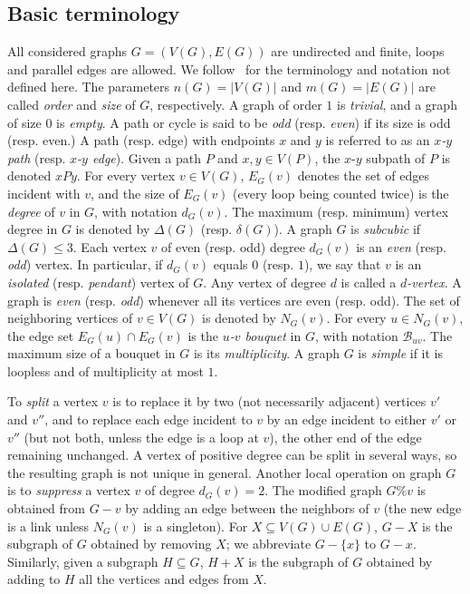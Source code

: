 \documentclass[a4paper,12pt]{article}
\numberwithin{equation}{section}
\begin{document}
\subsection{Basic terminology}

All considered graphs $G=(V(G),E(G))$ are undirected and finite, loops and parallel edges are allowed. We follow~\cite{BonMur08} for the terminology and notation not defined here. The parameters $n(G)=|V(G)|$ and $m(G)=|E(G)|$ are called \textit{order} and \textit{size} of $G$, respectively. A graph of order $1$ is \textit{trivial}, and a graph of size $0$ is \textit{empty}. A path or cycle is said to be \textit{odd} (resp. \textit{even}) if its size is odd (resp. even.) A path (resp. edge) with endpoints $x$ and $y$ is referred to as an \textit{$x$-$y$ path} (resp. \textit{$x$-$y$ edge}). Given a path $P$ and $x,y\in V(P)$, the $x$-$y$ subpath of $P$ is denoted $xPy$.
For every vertex $v\in V(G)$, $E_G(v)$ denotes the set of edges incident with $v$, and the size of $E_G(v)$ (every loop being counted twice) is the \textit{degree} of $v$ in $G$, with notation $d_{G}(v)$. The maximum (resp. minimum) vertex degree in $G$ is denoted by $\Delta(G)$ (resp. $\delta(G)$).  A graph $G$ is \textit{subcubic} if $\Delta(G)\leq 3$. Each vertex $v$ of even (resp. odd) degree $d_{G}(v)$ is an \textit{even} (resp. \textit{odd}) vertex. In particular, if $d_G(v)$ equals $0$ (resp. $1$), we say that $v$ is an \textit{isolated} (resp. \textit{pendant}) vertex of $G$. Any vertex of degree $d$ is called a \textit{$d$-vertex}. A graph is \textit{even} (resp. \textit{odd})
whenever all its vertices are even (resp. odd).
The set of neighboring vertices of $v\in V(G)$ is denoted by $N_G(v)$. For every $u\in N_G(v)$, the edge set $E_G(u)\cap E_G(v)$ is the \textit{$u$-$v$ bouquet} in $G$, with notation $\mathcal{B}_{uv}$.  The maximum size of a bouquet in $G$ is its \textit{multiplicity}. A graph $G$ is \textit{simple} if it is loopless and of multiplicity at most $1$.

To \textit{split} a vertex $v$ is to replace it by two (not necessarily adjacent) vertices $v'$ and $v''$, and to replace each edge incident to $v$ by an edge incident to either $v'$ or $v''$ (but not both, unless the edge is a loop at $v$), the other end of the edge remaining unchanged. A vertex of positive degree can be split in several ways, so the resulting graph is not unique in general. Another local operation on graph $G$ is to \textit{suppress} a vertex $v$ of degree $d_G(v)=2$. The modified graph $G\%v$ is obtained from $G-v$ by adding an edge between the neighbors of $v$ (the new edge is a link unless $N_G(v)$ is a singleton).
For $X\subseteq V(G)\cup E(G)$, $G-X$ is the subgraph of $G$ obtained by removing $X$; we abbreviate $G-\{x\}$ to $G-x$. Similarly, given a subgraph $H\subseteq G$, $H+X$ is the subgraph of $G$ obtained by adding to $H$ all the vertices and edges from $X$.
\end{document}
